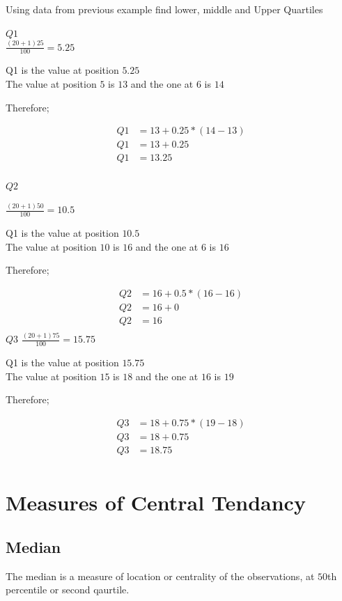 \documentclass[12pt]{article}
\begin{document}
Using data from previous example find lower, middle and Upper Quartiles

$Q1$ \\
$\frac{(20 + 1)25}{100} = 5.25$

Q1 is the value at position $5.25$ \\
The value at position $5$ is $13$ and the one at $6$ is $14$

Therefore;

\begin{align*}
    Q1 & = 13 + 0.25 *(14 - 13) \\
    Q1 & = 13 + 0.25            \\
    Q1 & = 13.25                \\
\end{align*}

$Q2$

$\frac{(20 + 1)50}{100} = 10.5$

Q1 is the value at position $10.5$ \\
The value at position $10$ is $16$ and the one at $6$ is $16$

Therefore;

\begin{align*}
    Q2 & = 16 + 0.5 *(16 - 16) \\
    Q2 & = 16 + 0              \\
    Q2 & = 16                  \\
\end{align*}
$Q3$
$\frac{(20 + 1)75}{100} = 15.75$

Q1 is the value at position $15.75$ \\
The value at position $15$ is $18$ and the one at $16$ is $19$

Therefore;

\begin{align*}
    Q3 & = 18 + 0.75 *(19 - 18) \\
    Q3 & = 18 + 0.75            \\
    Q3 & = 18.75                \\
\end{align*}

\newpage

\section{Measures of Central Tendancy}%

\subsection{Median}
The median is a measure of location or centrality of the observations, at $50$th percentile or second qaurtile.
\end{document}
